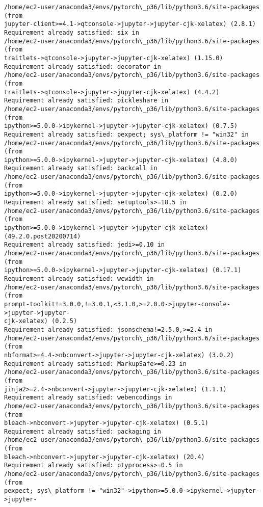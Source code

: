 \documentclass[11pt]{article}
\begin{document}
\begin{Verbatim}[commandchars=\\\{\}]
/home/ec2-user/anaconda3/envs/pytorch\_p36/lib/python3.6/site-packages (from
jupyter-client>=4.1->qtconsole->jupyter->jupyter-cjk-xelatex) (2.8.1)
Requirement already satisfied: six in
/home/ec2-user/anaconda3/envs/pytorch\_p36/lib/python3.6/site-packages (from
traitlets->qtconsole->jupyter->jupyter-cjk-xelatex) (1.15.0)
Requirement already satisfied: decorator in
/home/ec2-user/anaconda3/envs/pytorch\_p36/lib/python3.6/site-packages (from
traitlets->qtconsole->jupyter->jupyter-cjk-xelatex) (4.4.2)
Requirement already satisfied: pickleshare in
/home/ec2-user/anaconda3/envs/pytorch\_p36/lib/python3.6/site-packages (from
ipython>=5.0.0->ipykernel->jupyter->jupyter-cjk-xelatex) (0.7.5)
Requirement already satisfied: pexpect; sys\_platform != "win32" in
/home/ec2-user/anaconda3/envs/pytorch\_p36/lib/python3.6/site-packages (from
ipython>=5.0.0->ipykernel->jupyter->jupyter-cjk-xelatex) (4.8.0)
Requirement already satisfied: backcall in
/home/ec2-user/anaconda3/envs/pytorch\_p36/lib/python3.6/site-packages (from
ipython>=5.0.0->ipykernel->jupyter->jupyter-cjk-xelatex) (0.2.0)
Requirement already satisfied: setuptools>=18.5 in
/home/ec2-user/anaconda3/envs/pytorch\_p36/lib/python3.6/site-packages (from
ipython>=5.0.0->ipykernel->jupyter->jupyter-cjk-xelatex) (49.2.0.post20200714)
Requirement already satisfied: jedi>=0.10 in
/home/ec2-user/anaconda3/envs/pytorch\_p36/lib/python3.6/site-packages (from
ipython>=5.0.0->ipykernel->jupyter->jupyter-cjk-xelatex) (0.17.1)
Requirement already satisfied: wcwidth in
/home/ec2-user/anaconda3/envs/pytorch\_p36/lib/python3.6/site-packages (from
prompt-toolkit!=3.0.0,!=3.0.1,<3.1.0,>=2.0.0->jupyter-console->jupyter->jupyter-
cjk-xelatex) (0.2.5)
Requirement already satisfied: jsonschema!=2.5.0,>=2.4 in
/home/ec2-user/anaconda3/envs/pytorch\_p36/lib/python3.6/site-packages (from
nbformat>=4.4->nbconvert->jupyter->jupyter-cjk-xelatex) (3.0.2)
Requirement already satisfied: MarkupSafe>=0.23 in
/home/ec2-user/anaconda3/envs/pytorch\_p36/lib/python3.6/site-packages (from
jinja2>=2.4->nbconvert->jupyter->jupyter-cjk-xelatex) (1.1.1)
Requirement already satisfied: webencodings in
/home/ec2-user/anaconda3/envs/pytorch\_p36/lib/python3.6/site-packages (from
bleach->nbconvert->jupyter->jupyter-cjk-xelatex) (0.5.1)
Requirement already satisfied: packaging in
/home/ec2-user/anaconda3/envs/pytorch\_p36/lib/python3.6/site-packages (from
bleach->nbconvert->jupyter->jupyter-cjk-xelatex) (20.4)
Requirement already satisfied: ptyprocess>=0.5 in
/home/ec2-user/anaconda3/envs/pytorch\_p36/lib/python3.6/site-packages (from
pexpect; sys\_platform != "win32"->ipython>=5.0.0->ipykernel->jupyter->jupyter-

\end{Verbatim}
\end{document}
